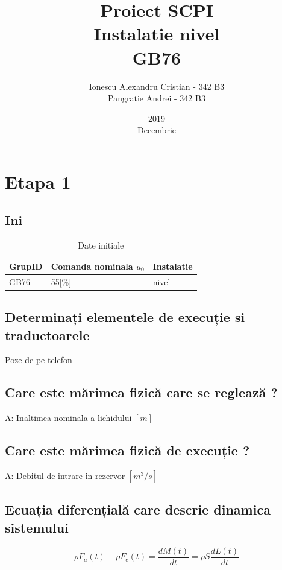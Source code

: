 \documentclass[12pt,english]{article}
\title{Proiect SCPI\\ Instalatie nivel\\ GB76}
\date{2019\\ Decembrie}
\author{Ionescu Alexandru Cristian - 342 B3\\Pangratie Andrei - 342 B3}
\begin{document}
\maketitle
\newpage

\tableofcontents
\newpage

\section {Etapa 1}
\subsection {Ini}

\begin{table}[H]
  \centering
  \begin{tabular}{|l|l|l|}
    \hline
    GrupID & Comanda nominala $u_0$ & Instalatie \\
    \hline
    GB76 & 55[\%] & nivel \\
    \hline
  \end{tabular}
  \caption{Date initiale}
\end{table}

\subsection {Determinați elementele de execuție si traductoarele}
Poze de pe telefon

\subsection {Care este mărimea fizică care se reglează ?}
A: Inaltimea nominala a lichidului $[m]$

\subsection {Care este mărimea fizică de execuție ?}
A: Debitul de intrare in rezervor $[m^3/s]$

\subsection {Ecuația diferențială care descrie dinamica sistemului}
\begin{center}
  \begin{equation*}
  \rho F_{a}( t) -\rho F_{e}( t) =\dfrac{dM( t)}{dt} =\rho S\dfrac{dL( t)}{dt}
  \end{equation*}
\end{center}
\end{document}

